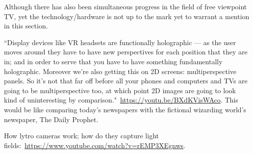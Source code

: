 Although there has also been simultaneous progress in the field of free viewpoint TV, yet the technology/hardware is not up to the mark yet to warrant a mention in this section.

``Display devices like VR headsets are functionally holographic --- as the user moves around they have to have new perspectives for each position that they are in; and in order to serve that you have to have something fundamentally holographic. Moreover we're also getting this on 2D screens: multiperspective panels. So it's not that far off before all your phones and computers and TVs are going to be multiperspective too, at which point 2D images are going to look kind of uninteresting by comparison."~\url{https://youtu.be/BXdKVisWAco}. This would be like comparing today's newspapers with the fictional wizarding world's newspaper, The Daily Prophet.

How lytro cameras work; how do they capture light fields:~\url{https://www.youtube.com/watch?v=rEMP3XEgnws}.

